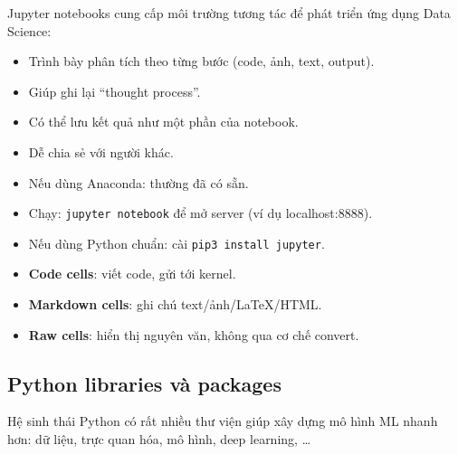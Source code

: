 \begin{ynghia}[title={Vì sao Jupyter hữu ích?}]
Jupyter notebooks cung cấp môi trường tương tác để phát triển ứng dụng Data Science:
\begin{itemize}
  \item Trình bày phân tích theo từng bước (code, ảnh, text, output).
  \item Giúp ghi lại “thought process”.
  \item Có thể lưu kết quả như một phần của notebook.
  \item Dễ chia sẻ với người khác.
\end{itemize}
\end{ynghia}

\begin{phuongphap}[title={Cài và chạy}]
\begin{itemize}
  \item Nếu dùng Anaconda: thường đã có sẵn.
  \item Chạy: \texttt{jupyter notebook} để mở server (ví dụ localhost:8888).
  \item Nếu dùng Python chuẩn: cài \texttt{pip3 install jupyter}.
\end{itemize}
\end{phuongphap}

\begin{dinhnghia}[title={Các loại cell trong Jupyter}]
\begin{itemize}
  \item \textbf{Code cells}: viết code, gửi tới kernel.
  \item \textbf{Markdown cells}: ghi chú text/ảnh/LaTeX/HTML.
  \item \textbf{Raw cells}: hiển thị nguyên văn, không qua cơ chế convert.
\end{itemize}
\end{dinhnghia}

\subsection{Python libraries và packages}

\begin{dongco}[title={Thư viện giúp làm nhanh và đúng}]
Hệ sinh thái Python có rất nhiều thư viện giúp xây dựng mô hình ML nhanh hơn: dữ liệu, trực quan hóa, mô hình, deep learning, \ldots
\end{dongco}

